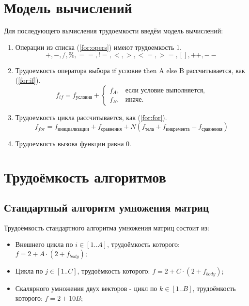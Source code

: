 \documentclass[12pt]{report}
\begin{document}
\section{Модель вычислений}

Для последующего вычисления трудоемкости введём модель вычислений:

\begin{enumerate}
	\item Операции из списка (\ref{for:opers}) имеют трудоемкость 1.
	\begin{equation}
	\label{for:opers}
	+, -, /, \%, ==, !=, <, >, <=, >=, [], ++, {-}-
	\end{equation}
	\item Трудоемкость оператора выбора if условие then A else B рассчитывается, как (\ref{for:if}).
	\begin{equation}
	\label{for:if}
	f_{if} = f_{\text{условия}} +
	\begin{cases}
	f_A, & \text{если условие выполняется,}\\
	f_B, & \text{иначе.}
	\end{cases}
	\end{equation}
	\item Трудоемкость цикла рассчитывается, как (\ref{for:for}).
	\begin{equation}
	\label{for:for}
	f_{for} = f_{\text{инициализации}} + f_{\text{сравнения}} + N(f_{\text{тела}} + f_{\text{инкремента}} + f_{\text{сравнения}})
	\end{equation}
	\item Трудоемкость вызова функции равна 0.
\end{enumerate}

\section{Трудоёмкость алгоритмов}

\subsection{Стандартный алгоритм умножения матриц}

Трудоёмкость стандартного алгоритма умножения матриц состоит из:
\begin{itemize}
	\item Внешнего цикла по $i \in [1..A]$, трудоёмкость которого: $f = 2 + A \cdot (2 + f_{body})$;
	\item Цикла по $j \in [1..C]$, трудоёмкость которого: $f = 2 + C \cdot (2 + f_{body})$;
	\item Скалярного умножения двух векторов - цикл по $k \in [1..B]$, трудоёмкость которого: $f = 2 + 10B$;
\end{itemize}
\end{document}
